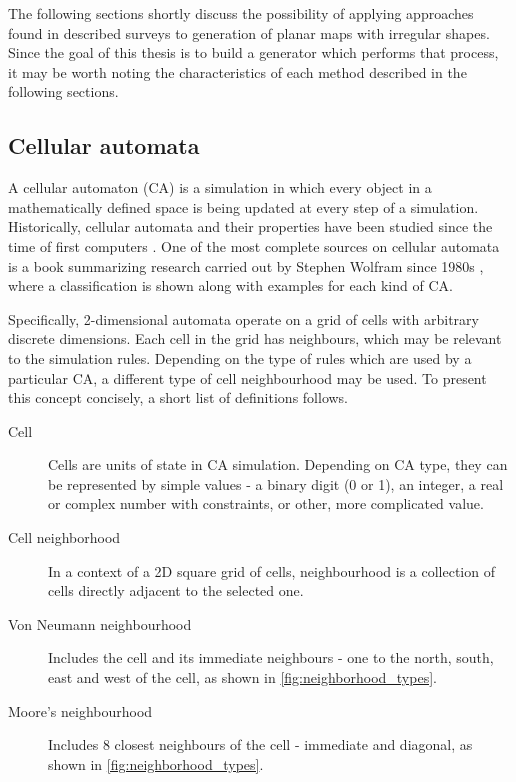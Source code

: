 \documentclass[12pt]{report}
\begin{document}
The following sections shortly discuss the possibility of applying approaches found in described surveys to generation of planar maps with irregular shapes. Since the goal of this thesis is to build a generator which performs that process, it may be worth noting the characteristics of each method described in the following sections.

\subsection{Cellular automata}
A cellular automaton (CA) is a simulation in which every object in a mathematically defined space is being updated at every step of a simulation. Historically, cellular automata and their properties have been studied since the time of first computers \autocite{Sarkar:2000:BHC:349194.349202}. One of the most complete sources on cellular automata is a book summarizing research carried out by Stephen Wolfram since 1980s \autocite{wolfram2002new}, where a classification is shown along with examples for each kind of CA. 

Specifically, 2-dimensional automata operate on a grid of cells with arbitrary discrete dimensions. Each cell in the grid has neighbours, which may be relevant to the simulation rules. Depending on the type of rules which are used by a particular CA, a different type of cell neighbourhood may be used. To present this concept concisely, a short list of definitions follows.

\begin{description}
	\item[Cell] Cells are units of state in CA simulation. Depending on CA type, they can be represented by simple values - a binary digit (0 or 1), an integer, a real or complex number with constraints, or other, more complicated value.  
	\item[Cell neighborhood] In a context of a 2D square grid of cells, neighbourhood is a collection of cells directly adjacent to the selected one.
	\item[Von Neumann neighbourhood] Includes the cell and its immediate neighbours - one to the north, south, east and west of the cell, as shown in  \cref{fig:neighborhood_types}.
	\item[Moore's neighbourhood] Includes 8 closest neighbours of the cell - immediate and diagonal, as shown in  \cref{fig:neighborhood_types}.
\end{description}
 
\end{document}
